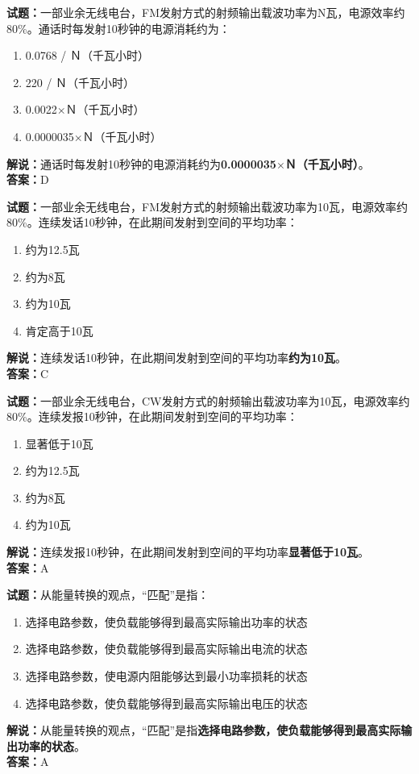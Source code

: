 \documentclass{ctexbook}
\begin{document}
\noindent\textbf{试题：}一部业余无线电台，FM发射方式的射频输出载波功率为N瓦，电源效率约80\%。通话时每发射10秒钟的电源消耗约为：
\begin{enumerate}[leftmargin=3em]
\item 0.0768 / Ｎ（千瓦小时）%
\item 220 / Ｎ（千瓦小时）
\item 0.0022$\times$Ｎ（千瓦小时）
\item 0.0000035$\times$Ｎ（千瓦小时）
\end{enumerate}
\noindent\textbf{解说：}通话时每发射10秒钟的电源消耗约为\textbf{0.0000035$\times$Ｎ（千瓦小时）}。\\\noindent\textbf{答案：}D





\bigskip


\noindent\textbf{试题：}一部业余无线电台，FM发射方式的射频输出载波功率为10瓦，电源效率约80\%。连续发话10秒钟，在此期间发射到空间的平均功率：
\begin{enumerate}[leftmargin=3em]
\item 约为12.5瓦
\item 约为8瓦
\item 约为10瓦
\item 肯定高于10瓦
\end{enumerate}
\noindent\textbf{解说：}连续发话10秒钟，在此期间发射到空间的平均功率\textbf{约为10瓦}。\\\noindent\textbf{答案：}C




\bigskip


\noindent\textbf{试题：}一部业余无线电台，CW发射方式的射频输出载波功率为10瓦，电源效率约80\%。连续发报10秒钟，在此期间发射到空间的平均功率：
\begin{enumerate}[leftmargin=3em]
\item 显著低于10瓦
\item 约为12.5瓦
\item 约为8瓦
\item 约为10瓦
\end{enumerate}
\noindent\textbf{解说：}连续发报10秒钟，在此期间发射到空间的平均功率\textbf{显著低于10瓦}。\\\noindent\textbf{答案：}A




\bigskip


\noindent\textbf{试题：}从能量转换的观点，“匹配”是指：
\begin{enumerate}[leftmargin=3em]
\item 选择电路参数，使负载能够得到最高实际输出功率的状态
\item 选择电路参数，使负载能够得到最高实际输出电流的状态
\item 选择电路参数，使电源内阻能够达到最小功率损耗的状态
\item 选择电路参数，使负载能够得到最高实际输出电压的状态
\end{enumerate}
\noindent\textbf{解说：}从能量转换的观点，“匹配”是指\textbf{选择电路参数，使负载能够得到最高实际输出功率的状态}。\\\noindent\textbf{答案：}A
\end{document}

